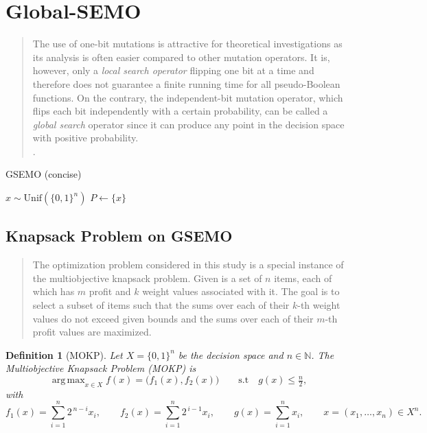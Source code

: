 \documentclass[a4paper, 11pt]{report}
\DeclareMathOperator*{\argmax}{arg\,max}
\newtheorem{definition}{Definition}
\theoremstyle{remark}
\begin{document}
\section{Global-SEMO}
    \begin{quote}
        The use of one-bit mutations is attractive for theoretical investigations as its analysis is often easier compared to other mutation operators. It
        is, however, only a \emph{local search operator} flipping one bit at a time and therefore does not guarantee a finite running time for all pseudo-Boolean
        functions. On the contrary, the independent-bit mutation operator, which flips each bit independently with a certain probability, can be called a 
        \emph{global search} operator since it can produce any point in the decision space with positive probability.\\
        \cite{laumanns2004running}.
    \end{quote}
    \begin{algorithm}[H]
        \caption{GSEMO (concise)}
        $x \sim \mathrm{Unif}(\{0,1\}^n)$\;
        $P \gets \{x\}$\;
    \end{algorithm}
\subsection{Knapsack Problem on GSEMO \cite{laumanns2004running}}
\begin{quote}
The optimization problem considered in this study is a special instance of the multiobjective knapsack problem. Given is a set of $n$ items, each 
of which has $m$ profit and $k$ weight values associated with it. The goal is to select a subset of items such that the sums over each of their 
$k$-th weight values do not exceed given bounds and the sums over each of their $m$-th profit values are maximized.
\end{quote}

\begin{definition}[MOKP]
Let $X=\{0,1\}^n$ be the decision space and $n\in\mathbb{N}$. The Multiobjective Knapsack Problem (MOKP) is
\begin{equation*}
    \argmax_{x\in X}f(x)=\bigl(f_1(x),f_2(x)\bigr)
    \qquad
    \mathrm{s.t}\quad g(x)\le \tfrac{n}{2},
\end{equation*}
with
\[
f_1(x)=\sum_{i=1}^{n}2^{\,n-i}x_i,\qquad
f_2(x)=\sum_{i=1}^{n}2^{\,i-1}x_i,\qquad
g(x)=\sum_{i=1}^{n}x_i,\qquad
x=(x_1,\ldots,x_n)\in X^n.
\]
\end{definition}
\end{document}
